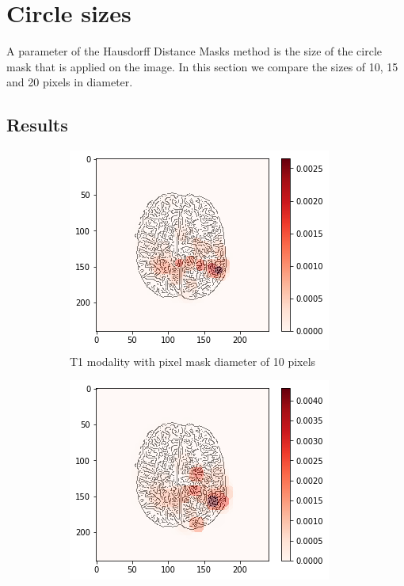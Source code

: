 \section{Circle sizes}
\label{hdm_circle_size}
A parameter of the Hausdorff Distance Masks method is the size of the circle mask that is applied on the image. In this section we compare the sizes of 10, 15 and 20 pixels in diameter.

\subsection{Results}

\begin{figure}[H]
    \centering
    \begin{subfigure}{.32\textwidth}
        \centering
        \includegraphics[width=\linewidth]{chapters/06_hdm/b_Brats18_TCIA08_242_1_L2/23.png}
        \caption{T1 modality with pixel mask diameter of 10 pixels}
    \end{subfigure}\hfill%
    \begin{subfigure}{.32\textwidth}
        \centering
        \includegraphics[width=\linewidth]{chapters/06_hdm/circle15/3.png}

\end{subfigure}
\end{figure}
